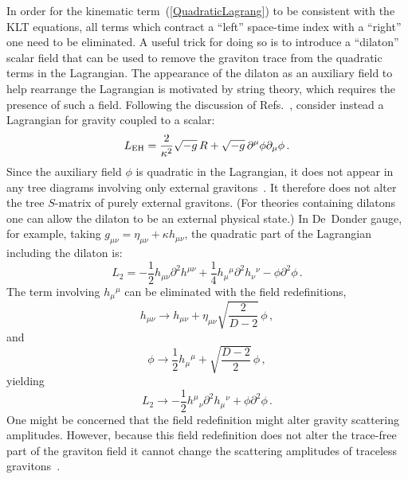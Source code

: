 In order for the kinematic term~(\ref{QuadraticLagrang}) to be
consistent with the KLT equations, all terms which contract a ``left''
space-time index with a ``right'' one need to be eliminated.  A useful
trick for doing so is to introduce a ``dilaton'' scalar field that can be used to
remove the graviton trace from the quadratic terms in the Lagrangian.
The appearance of the dilaton as an auxiliary field to help rearrange
the Lagrangian is motivated by string theory, which requires the
presence of such a field.  Following the discussion of
Refs.~\cite{BDS,BernGrant}, consider instead a Lagrangian for gravity
coupled to a scalar:
%
\begin{equation}
L_{\rm EH} =   {2\over \kappa^2} \sqrt{-g} \, 
       R +  \sqrt{-g} \, \partial^\mu\phi\partial_\mu\phi \,.
\end{equation}
%
Since the auxiliary field $\phi$ is quadratic in the Lagrangian, it
does not appear in any tree diagrams involving only external
gravitons~\cite{BernGrant}.  It therefore does not alter the tree
$S$-matrix of purely external gravitons.  (For theories containing
dilatons one can allow the dilaton to be an external physical
state.)  In De~Donder gauge, for example, taking $g_{\mu\nu} =
\eta_{\mu\nu} + \kappa h_{\mu\nu}$, the quadratic part of the
Lagrangian including the dilaton is:
%
\begin{equation}
L_2 = - \frac{1}{2} h_{\mu\nu} \partial^2 h^{\mu\nu} 
+ \frac{1}{4} h_{\mu}{}^{\mu} \partial^2 h_{\nu}{}^{\nu}
-  \phi \partial^2 \phi \,.
\end{equation}
%
The term involving $h_{\mu}{}^{\mu}$ can be eliminated with the
field redefinitions,
%
\begin{equation}
 h_{\mu\nu} \rightarrow h_{\mu\nu} 
        + \eta_{\mu\nu}{\sqrt{\frac{2}{D-2}}}\, \phi\,,
\end{equation}
and
%
\begin{equation}
 \phi \rightarrow \frac{1}{2} h_{\mu}{}^{\mu} + \sqrt{\frac{D-2}{2}}\, \phi\,,
\label{FieldRedefA}
\end{equation}
%
yielding
%
\begin{equation}
L_2 \rightarrow 
- \frac{1}{2} h^{\mu}{}_{\nu} \partial^2 h_{\mu}{}^{\nu} 
+  \phi \partial^2 \phi\,.
\end{equation}
%
One might be concerned that the field redefinition might alter gravity
scattering amplitudes.  However, because this field redefinition does
not alter the trace-free part of the graviton field it cannot change
the scattering amplitudes of traceless
gravitons~\cite{BernGrant}. 

